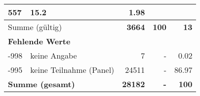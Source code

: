 \begin{longtable}{lXrrr}
       \num{557} &
       \num[round-mode=places,round-precision=2]{15,2} &
         \num[round-mode=places,round-precision=2]{1,98} \\
     \midrule
     \multicolumn{2}{l}{Summe (gültig)} &
       \textbf{\num{3664}} &
     \textbf{100} &
       \textbf{\num[round-mode=places,round-precision=2]{13}} \\
     \multicolumn{5}{l}{\textbf{Fehlende Werte}}\\
       -998 &
       keine Angabe &
         \num{7} &
        - &
         \num[round-mode=places,round-precision=2]{0,02} \\
       -995 &
       keine Teilnahme (Panel) &
         \num{24511} &
        - &
         \num[round-mode=places,round-precision=2]{86,97} \\
     \midrule
     \multicolumn{2}{l}{\textbf{Summe (gesamt)}} &
          \textbf{\num{28182}} &
        \textbf{-} &
        \textbf{100} \\
     \bottomrule
     \end{longtable}
     
